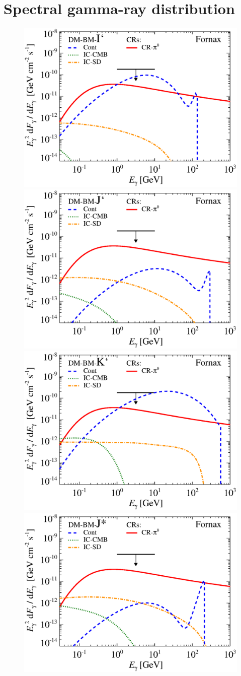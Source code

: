 \documentclass[10pt,aps,pra,reprint,amsmath,amsfonts,amssymb,showpacs]{revtex4-1}
\begin{document}
\section{Spectral gamma-ray distribution}


\begin{figure}
\begin{minipage}{2.0\columnwidth}
 \includegraphics[width=0.49\columnwidth]{figures/flux.BMcompI.v9.0.1deg.1.6T.SubMass.IR2.noMW.woGal.eps}
\includegraphics[width=0.49\columnwidth]{figures/flux.BMcompJ.v9.0.1deg.1.6T.SubMass.IR2.noMW.woGal.eps}
\includegraphics[width=0.49\columnwidth]{figures/flux.BMcompK.v9.0.1deg.1.6T.SubMass.IR2.noMW.woGal.eps}
\includegraphics[width=0.49\columnwidth]{figures/flux.BMcompJs.v9.0.1deg.1.6T.SubMass.IR2.noMW.woGal.eps}

\end{minipage}
\end{figure}
\end{document}
